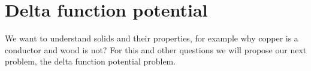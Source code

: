 






\setchapterpreamble[u]{\margintoc}
\chapter{Delta function potential}

We want to understand solids and their properties, for example why copper is a conductor and wood is not? For this and other questions we will propose our next problem, the delta function potential problem.


